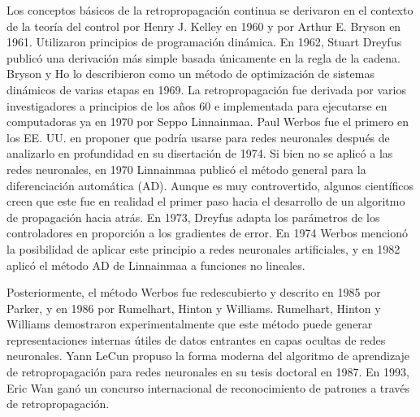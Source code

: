 \documentclass[a4paper]{article}
\begin{document}
Los conceptos básicos de la retropropagación continua se derivaron 
en el contexto de la teoría del control por Henry J. Kelley en 
1960 y por Arthur E. Bryson en 1961. Utilizaron principios de 
programación dinámica. En 1962, Stuart Dreyfus publicó una 
derivación más simple basada únicamente en la regla de la cadena. 
Bryson y Ho lo describieron como un método de optimización de 
sistemas dinámicos de varias etapas en 1969. La retropropagación 
fue derivada por varios investigadores a principios de los años 60 
e implementada para ejecutarse en computadoras ya en 1970 por 
Seppo Linnainmaa. Paul Werbos fue el primero en los EE. UU. en 
proponer que podría usarse para redes neuronales después de 
analizarlo en profundidad en su disertación de 1974. Si bien no se 
aplicó a las redes neuronales, en 1970 Linnainmaa publicó el 
método general para la diferenciación automática (AD). Aunque es 
muy controvertido, algunos científicos creen que este fue en 
realidad el primer paso hacia el desarrollo de un algoritmo de 
propagación hacia atrás. En 1973, Dreyfus adapta los parámetros de 
los controladores en proporción a los gradientes de error. En 1974 
Werbos mencionó la posibilidad de aplicar este principio a redes 
neuronales artificiales, y en 1982 aplicó el método AD de 
Linnainmaa a funciones no lineales.

Posteriormente, el método Werbos fue redescubierto y descrito en 
1985 por Parker, y en 1986 por Rumelhart, Hinton y Williams. 
Rumelhart, Hinton y Williams demostraron experimentalmente que 
este método puede generar representaciones internas útiles de 
datos entrantes en capas ocultas de redes neuronales. Yann LeCun 
propuso la forma moderna del algoritmo de aprendizaje de 
retropropagación para redes neuronales en su tesis doctoral en 
1987. En 1993, Eric Wan ganó un concurso internacional de 
reconocimiento de patrones a través de retropropagación.
\end{document}
